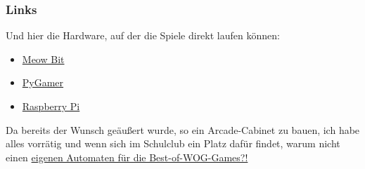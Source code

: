 \documentclass{beamer}
\begin{document}
  \begin{frame}
\frametitle{Links}
Und hier die Hardware, auf der die Spiele direkt laufen können:

\begin{itemize}
\item \href{https://www.youtube.com/watch?v=uJJlJ_WFcT0}{Meow Bit} 
\item \href{https://www.adafruit.com/product/4242}{PyGamer}
\item \href{https://arcade.makecode.com/hardware/raspberry-pi/wooden-cabinet}{Raspberry Pi}
\end{itemize}

Da bereits der Wunsch geäußert wurde, so ein Arcade-Cabinet zu bauen, ich habe alles vorrätig und wenn sich im Schulclub ein Platz dafür findet, warum nicht einen \href{https://www.thegeekpub.com/4506/build-retropie-bartop-arcade-cabinet/}{eigenen Automaten für die Best-of-WOG-Games?!}

 \end{frame}
\end{document}
